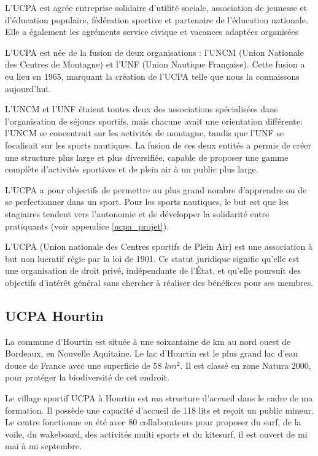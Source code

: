 \documentclass[11pt,a4paper]{report}
\begin{document}
L’UCPA est agrée entreprise solidaire d’utilité sociale, association de
jeunesse et d’éducation populaire, fédération sportive et partenaire de 
l’éducation nationale. Elle a également les agréments service civique et
vacances adaptées organisées

L'UCPA est  née de la fusion de deux organisations : l'UNCM 
(Union Nationale des Centres de Montagne)
et l'UNF (Union Nautique Française). Cette fusion a eu lieu en
1965, marquant la création de l'UCPA telle que nous la connaissons
aujourd'hui.

L'UNCM et l'UNF étaient toutes deux des associations spécialisées
dans l'organisation de séjours sportifs, mais chacune avait une
orientation différente: l'UNCM se concentrait sur les activités 
de montagne, tandis que l'UNF se focalisait sur les sports nautiques. 
La fusion de ces deux entités a permis de créer une structure plus 
large et plus diversifiée, capable de proposer une gamme complète 
d'activités sportives et de plein air à un public plus large.

L'UCPA a pour objectifs de permettre au plus grand nombre
d'apprendre ou de se perfectionner dans un sport.
Pour les sports nautiques, le but est que les stagiaires
tendent vers l'autonomie  et de développer la solidarité entre
pratiquants (voir appendice \ref{ucpa_projet}).


L'UCPA (Union nationale des Centres sportifs de Plein Air) est 
une association à but non lucratif régie par la loi de 1901. 
Ce statut juridique signifie qu'elle est une organisation de
droit privé, indépendante de l'État, et qu'elle poursuit des
objectifs d'intérêt général sans chercher à  réaliser des
bénéfices pour ses membres.

\subsection{UCPA Hourtin}
La commune d'Hourtin est située à une soixantaine de km au nord ouest 
de Bordeaux, en Nouvelle Aquitaine. Le lac d'Hourtin est le plus grand
lac d'eau douce de France avec une superficie de $58 \,\,km^2$.
Il est classé en zone Natura 2000\cite{natura2000}, 
pour protéger la biodiversité de cet endroit.

Le village sportif UCPA à Hourtin est ma structure d'accueil dans le cadre de
ma formation. Il possède une capacité d'accueil de 118 lits et reçoit un 
public mineur. Le centre fonctionne en été avec 80 collaborateurs pour
proposer du surf, de la voile, du wakeboard, des activités multi sports
et du kitesurf, il est ouvert de mi mai à mi septembre.
 
\end{document}
